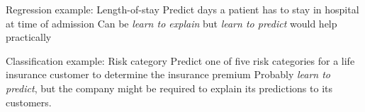 \documentclass[11pt,compress,t,notes=noshow, xcolor=table]{beamer}
\begin{document}
\begin{frame2}{Regression example: Length-of-stay}
Predict days a patient has to stay in hospital at time of admission
\vfill
{} %
\vfill
{}
\vfill
Can be \textit{learn to explain} but \textit{learn to predict} would help practically 
\end{frame2}


\begin{frame2}{Classification example: Risk category}
Predict one of five risk categories for a life insurance customer to determine the insurance premium 
\vfill
{} %
\vfill
{}
\vfill
Probably \textit{learn to predict}, but the company might be required to explain
its predictions to its customers.
\end{frame2}

\endlecture
\end{document}
